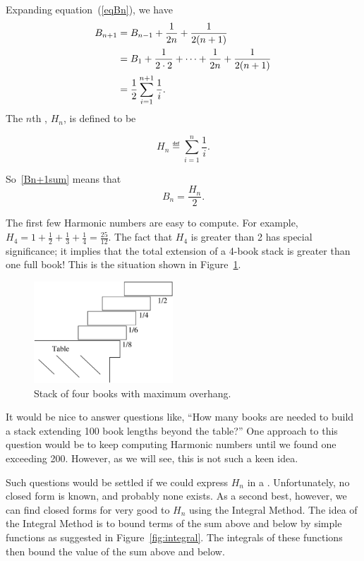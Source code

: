 Expanding equation~(\ref{eqBn}), we have
\begin{align}
B_{n+1} & = B_{n-1} + \frac{1}{2n} + \frac{1}{2(n+1)}\notag\\
        & = B_1 + \frac{1}{2 \cdot 2} + \cdots + \frac{1}{2n} +
            \frac{1}{2(n+1)}\notag\\
        & = \frac{1}{2}\sum_{i=1}^{n+1} \frac{1}{i}.\label{Bn+1sum}
\end{align}
The $n$th , $H_n$, is defined to be
\begin{definition}
\[
H_n \eqdef \sum_{i=1}^n \frac{1}{i}.
\]
\end{definition}
So~\eqref{Bn+1sum} means that
\[
B_n = \frac{H_n}{2}.
\]

The first few Harmonic numbers are easy to compute.  For example, $H_4 = 1
+ \frac{1}{2} + \frac{1}{3} + \frac{1}{4} = \frac{25}{12}$.  The fact that
$H_4$ is greater than 2 has special significance; it implies that the
total extension of a 4-book stack is greater than one full book!  This is
the situation shown in Figure~\ref{fig:optstack}.

\begin{figure}[htbp]
\centerline{\includegraphics[height=1.5in]{figures/optstack}}
\caption{Stack of four books with maximum overhang.}
\label{fig:optstack}
\end{figure}


It would be nice to answer questions like, ``How many books are needed
to build a stack extending 100 book lengths beyond the table?''  One
approach to this question would be to keep computing Harmonic numbers
until we found one exceeding 200.  However, as we will see, this is
not such a keen idea.

Such questions would be settled if we could express $H_n$ in a .  Unfortunately, no closed form is known, and probably none
exists.  As a second best, however, we can find closed forms for very good
 to $H_n$ using the Integral Method.  The idea of the
Integral Method is to bound terms of the sum above and below by simple
functions as suggested in Figure~\ref{fig:integral}.  The integrals of
these functions then bound the value of the sum above and below.

